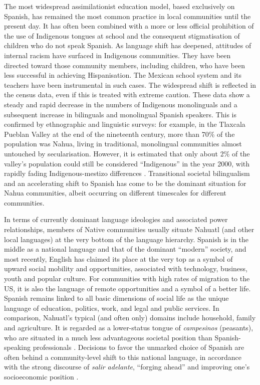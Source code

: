 \documentclass[output=paper,hidelinks]{langscibook}
\begin{document}
The most widespread assimilationist education model, based exclusively on Spanish, has remained the most common practice in local communities until the present day. It has often been combined with a more or less official prohibition of the use of Indigenous tongues at school and the consequent stigmatisation of children who do not speak Spanish. As language shift has deepened, attitudes of internal racism have surfaced in Indigenous communities. They have been directed toward those community members, including children, who have been less successful in achieving Hispanisation. The Mexican school system and its teachers have been instrumental in such cases. The widespread shift is reflected in the census data, even if this is treated with extreme caution. These data show a steady and rapid decrease in the numbers of Indigenous monolinguals and a subsequent increase in bilinguals and monolingual Spanish speakers. This is confirmed by ethnographic and linguistic surveys: for example, in the Tlaxcala Pueblan Valley at the end of the nineteenth century, more than 70\% of the population was Nahua, living in traditional, monolingual communities almost untouched by secularisation. However, it is estimated that only about 2\% of the valley’s population could still be considered ``Indigenous'' in the year 2000, with rapidly fading Indigenous-mestizo differences \citep[194]{nutiniisaac2009}. Transitional societal bilingualism and an accelerating shift to Spanish has come to be the dominant situation for Nahua communities, albeit occurring on different timescales for different communities.

In terms of currently dominant language ideologies and associated power relationships, members of Native communities usually situate Nahuatl (and other local languages) at the very bottom of the language hierarchy. Spanish is in the middle as a national language and that of the dominant ``modern'' society, and most recently, English has claimed its place at the very top as a symbol of upward social mobility and opportunities, associated with technology, business, youth and popular culture. For communities with high rates of migration to the US, it is also the language of remote opportunities and a symbol of a better life. Spanish remains linked to all basic dimensions of social life as the unique language of education, politics, work, and legal and public services. In comparison, Nahuatl’s typical (and often only) domains include household, family and agriculture. It is regarded as a lower-status tongue of \textit{campesinos} (peasants), who are situated in a much less advantageous societal position than Spanish-speaking professionals \citep{sandoval2017}. Decisions to favor the unmarked choice of Spanish are often behind a community-level shift to this national language, in accordance with the strong discourse of \textit{salir adelante}, ``forging ahead'' and improving one’s socioeconomic position \citep[569--572]{messing2007}.
\end{document}

